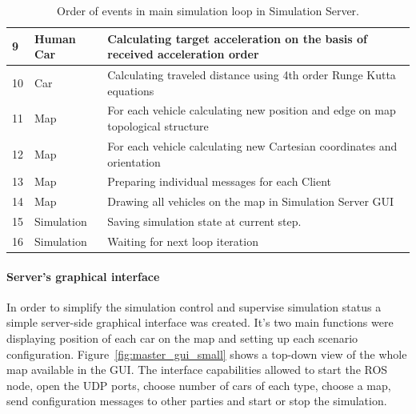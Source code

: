 \documentclass[11pt,english,twoside]{article}
\begin{document}
\begin{table}[]
\begin{tabular}{|l|p{2cm}|p{11cm}|}
9         & Human Car                    
& Calculating target acceleration on the basis of received acceleration order                            \\ \hline
10        & Car                                 & Calculating traveled distance using 4th order Runge Kutta equations                                    \\ \hline
11        & Map                                 & For each vehicle calculating new position and edge on map topological structure                     \\ \hline
12        & Map                                 & For each vehicle calculating new Cartesian coordinates and orientation                                 \\ \hline
13        & Map                                 & Preparing individual messages for each Client                                                          \\ \hline
14        & Map                                 & Drawing all vehicles on the map in Simulation Server GUI                                               \\ \hline
15        & Simulation                          & Saving simulation state at current step.                                                               \\ \hline
16        & Simulation                          & Waiting for next loop iteration                                                                        \\ \hline
\end{tabular}
\caption{Order of events in main simulation loop in Simulation Server.}
\label{table:order_server}
\end{table}


\paragraph{Server's graphical interface}


In order to simplify the simulation control and supervise simulation status a simple server-side graphical interface was created. It's two main functions were displaying position of each car on the map and setting up each scenario configuration. Figure~\ref{fig:master_gui_small} shows a top-down view of the whole map available in the GUI. The interface capabilities allowed to start the ROS node, open the UDP ports, choose number of cars of each type, choose a map, send configuration messages to other parties and start or stop the simulation. 
\end{document}
